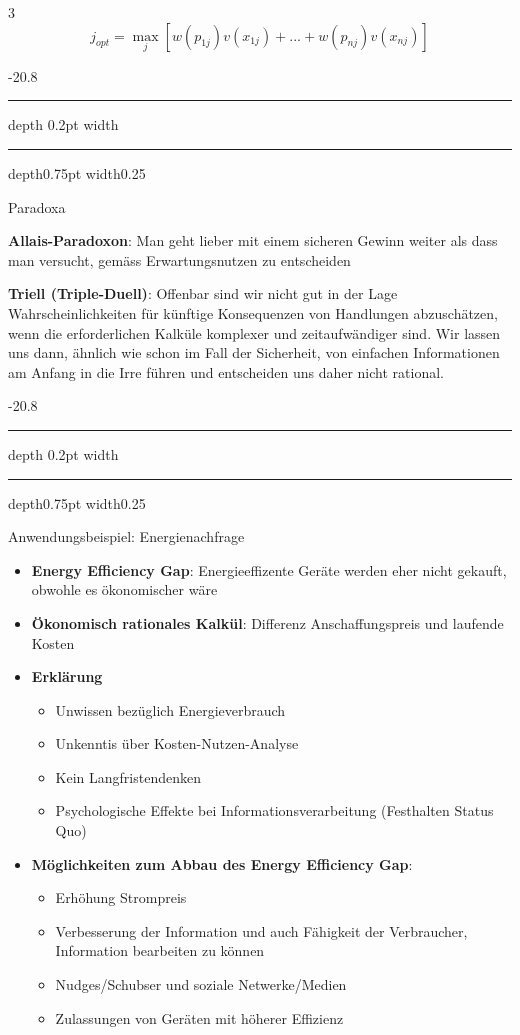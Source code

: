 \documentclass[9pt, landscape, fleqn]{scrartcl}
\makeatletter
\renewcommand{\subsection}{\@startsection{subsection}{1}{0mm}%
{-2\baselineskip}{0.8\baselineskip}%
{\hrule depth 0.2pt width\columnwidth\hrule depth0.75pt
width0.25\columnwidth\vspace*{1.2em}\large\bfseries\rmfamily}}
\makeatother
\begin{document}
\begin{multicols*}{3}
\begin{equation}
    j_{opt} = \max\limits_j\left[ w(p_{1j})v(x_{1j})+...+w(p_{nj})v(x_{nj})\right]
\end{equation}

\subsection{Paradoxa}

\textbf{Allais-Paradoxon}: Man geht lieber mit einem sicheren Gewinn weiter als dass man versucht, gemäss Erwartungsnutzen zu entscheiden 

\textbf{Triell (Triple-Duell)}: Offenbar sind wir nicht gut in der Lage Wahrscheinlichkeiten für künftige Konsequenzen von Handlungen abzuschätzen, wenn die erforderlichen Kalküle komplexer und zeitaufwändiger sind. Wir lassen uns dann, ähnlich wie schon im Fall der Sicherheit, von einfachen Informationen am Anfang in die Irre führen und entscheiden uns daher nicht rational.

\subsection{Anwendungsbeispiel: Energienachfrage}

\begin{itemize}
    \item \textbf{Energy Efficiency Gap}: Energieeffizente Geräte werden eher nicht gekauft, obwohle es ökonomischer wäre 
    \item \textbf{Ökonomisch rationales Kalkül}: Differenz Anschaffungspreis und laufende Kosten 
    \item \textbf{Erklärung}
        \begin{itemize}
            \item Unwissen bezüglich Energieverbrauch
            \item Unkenntis über Kosten-Nutzen-Analyse 
            \item Kein Langfristendenken 
            \item Psychologische Effekte bei Informationsverarbeitung (Festhalten Status Quo)
        \end{itemize}
    \item \textbf{Möglichkeiten zum Abbau des Energy Efficiency Gap}:
        \begin{itemize}
            \item Erhöhung Strompreis
            \item Verbesserung der Information und auch Fähigkeit der Verbraucher, Information bearbeiten zu können
            \item Nudges/Schubser und soziale Netwerke/Medien 
            \item Zulassungen von Geräten mit höherer Effizienz 
        \end{itemize}    
\end{itemize}


\end{multicols*}
\end{document}
